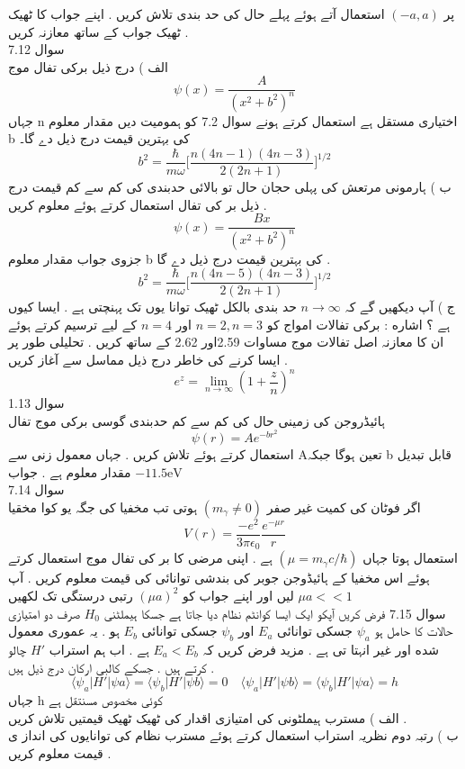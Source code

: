 پر
\((-a,a)\)
استعمال آتے ہوئے پہلے حال کی حد بندی تلاش کریں . اپنے جواب کا ٹھیک ٹھیک جواب کے ساتھ معازنہ کریں .\\
سوال 
7.12\\
الف ) درج ذیل برکی تفال موج 
\[\psi(x)=\frac{A}{(x^{2}+b^{2})^n}\]
جہاں n اختیاری مستقل ہے استعمال کرتے ہونے سوال 7.2 کو ہمومیت دیں مقدار معلوم b کی بہترین قیمت درج ذیل دے گا۔
\[b^{2}=\frac{\hbar}{m\omega}\big[\frac{n(4n-1)(4n-3)}{2(2n+1)}\big]^{1/2}\]
ب ) ہارمونی مرتعش کی پہلی حجان حال تو بالائی حدبندی کی کم سے کم قیمت درج ذیل بر کی تفال استعمال کرتے ہوئے معلوم کریں .
\[\psi(x)=\frac{Bx}{(x^{2}+b^{2})^n}\]
جزوی جواب مقدار معلوم b کی بہترین قیمت درج ذیل دے گا .
\[b^{2}=\frac{\hbar}{m\omega}\big[\frac{n(4n-5)(4n-3)}{2(2n+1)}\big]^{1/2}\]
ج ) آپ دیکھیں گے کہ
\( n\rightarrow \infty\)
حد بندی بالکل ٹھیک توانا یوں تک پہنچتی ہے . ایسا کیوں ہے ؟
اشاره : برکی تفالات امواج کو
\(n=2,n=3\)
اور
\(n=4\)
کے لیے ترسیم کرتے ہوئے ان کا معازنہ اصل تفالات موج مساوات 2.59اور 2.62 کے ساتھ کریں . تحلیلی طور پر ایسا کرنے کی خاطر درج ذیل مماسل سے آغاز کریں .
\[e^{z}=\lim_{n \to \infty}(1+\frac{z}{n})^{n}\]
سوال 
1.13\\
ہائیڈروجن کی زمینی حال کی کم سے کم حدبندی گوسی برکی موج تفال
\[\psi(r)=Ae^{-br^{2}}\]
استعمال کرتے ہوئے تلاش کریں . جہاں معمول زنی سے Aتعین ہوگا جبکہ b  قابل تبدیل مقدار معلوم ہے . جواب
\(-11.5\text{eV}\)\\
سوال 
7.14\\
اگر فوٹان  کی کمیت غیر صفر
\((m_{\gamma}\neq 0)\)
ہوتی تب مخفیا کی جگہ یو کوا مخقیا
\[V(r)=\frac{-e^{2}}{3\pi\epsilon_{0}}\frac{e^{-\mu r}}{r}\]
استعمال ہوتا جہاں
\((\mu=m_{\gamma}c/\hbar)\)
ہے . اپنی مرضی کا بر کی تفال موج استعمال کرتے ہوئے اس مخفيا کے ہائیڈوجن جوبر کی بندشی توانائی کی قیمت معلوم کریں . آپ
\(\mu a <<1\)
لیں اور اپنے جواب کو
\((\mu a)^{2}\)
رتبی درستگی تک لکھیں\\
سوال 7.15
فرض کریں آپکو ایک ایسا کوانٹم نظام دیا جاتا ہے جسکا ہیملٹنی
\(H_{0}\)
صرف دو امتیازی حالات کا حامل ہو
\(\psi_{a}\)
جسکی توانائی
\(E_{a}\)
اور
\(\psi_{b}\)
جسکی توانائی
\(E_{b}\)
ہو . یہ عموری معمول شده اور غیر انہتا تی ہے . مزید فرض کریں کہ
\(E_{a}<E_{b}\)
ہے . اب ہم استراب
\(H'\)
چالو کرتے ہیں . جسکے کالبی ارکان درج ذیل ہیں .
\[\langle \psi_{a}|H'|\psi{a}\rangle=\langle \psi_{b}|H'|\psi{b}\rangle=0\quad \langle \psi_{a}|H'|\psi{b}\rangle=\langle \psi_{b}|H'|\psi{a}\rangle=h\]
جہاں h کوئی مخصوص مسنتقل ہے\\
الف ) مسترب ہیملٹونی کی امتیازی اقدار کی ٹھیک ٹھیک قیمتیں تلاش کریں .\\
ب ) رتبہ دوم نظریہ استراب استعمال کرتے ہوئے مسترب نظام کی توانایوں کی انداز ی قیمت معلوم کریں .\\
